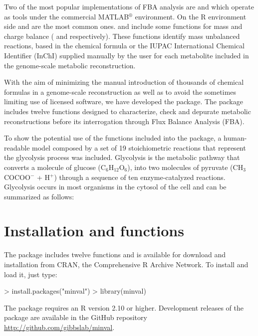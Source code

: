 Two of the most popular implementations of FBA analysis are  \citep{Becker2007} and  \citep{Agren2013} which operate as tools under the commercial MATLAB$^{\circledR}$ environment.  On the R environment side   and  are the most common ones.  and  include  some functions for mass and charge balance ( and  respectively). These functions identify mass unbalanced reactions, based in the chemical formula or the IUPAC International Chemical Identifier (InChI) supplied manually by the user for each metabolite included in the genome-scale metabolic reconstruction.

With the aim of minimizing the manual introduction of thousands of chemical formulas in a genome-scale reconstruction as well as to avoid the sometimes limiting use of licensed software, we have developed the  package. The  package includes twelve functions designed to characterize, check and depurate metabolic reconstructions before its interrogation through Flux Balance Analysis (FBA).

To show the potential use of the functions included into the  package, a human-readable model composed by a set of 19 stoichiometric reactions that represent the glycolysis process was included. Glycolysis is the metabolic pathway that converts a molecule of glucose (C$_{6}$H$_{12}$O$_{6}$), into two molecules of pyruvate (CH$_{3}$COCOO$^{-}$ + H$^{+}$) through a  sequence of ten enzyme-catalyzed reactions. Glycolysis occurs in most organisms in the cytosol of the cell and can be summarized as follows: 

\section{Installation and functions}
The  package includes twelve functions and is available for download and installation from CRAN, the
Comprehensive R Archive Network. To install and load it, just type:
\begin{Schunk}
\begin{Sinput}
> install.packages("minval")
> library(minval)
\end{Sinput}
\end{Schunk}
\noindent The  package requires an R version 2.10 or higher. Development releases of the package are available in the GitHub repository \url{http://github.com/gibbslab/minval}.


